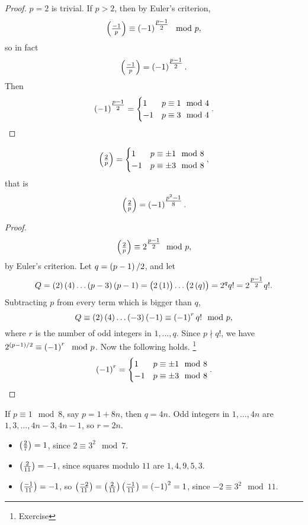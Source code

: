 \begin{proof}
$ p = 2 $ is trivial. If $ p > 2 $, then by Euler's criterion,
$$ \jacobi{-1}{p} \equiv \br{-1}^{\tfrac{p - 1}{2}} \mod p, $$
so in fact
$$ \jacobi{-1}{p} = \br{-1}^{\tfrac{p - 1}{2}}. $$
Then
$$ \br{-1}^{\tfrac{p - 1}{2}} =
\begin{cases}
1 & p \equiv 1 \mod 4 \\
-1 & p \equiv 3 \mod 4
\end{cases}.
$$
\end{proof}

\begin{proposition}
$$ \jacobi{2}{p} =
\begin{cases}
1 & p \equiv \pm 1 \mod 8 \\
-1 & p \equiv \pm 3 \mod 8
\end{cases},
$$
that is
$$ \jacobi{2}{p} = \br{-1}^{\tfrac{p^2 - 1}{8}}. $$
\end{proposition}

\begin{proof}
$$ \jacobi{2}{p} \equiv 2^{\tfrac{p - 1}{2}} \mod p, $$
by Euler's criterion. Let $ q = \br{p - 1} / 2 $, and let
$$ Q = \br{2}\br{4} \dots \br{p - 3}\br{p - 1} = \br{2\br{1}} \dots \br{2\br{q}} = 2^qq! = 2^{\tfrac{p - 1}{2}}q!. $$
Subtracting $ p $ from every term which is bigger than $ q $,
$$ Q \equiv \br{2}\br{4} \dots \br{-3}\br{-1} \equiv \br{-1}^rq! \mod p, $$
where $ r $ is the number of odd integers in $ 1, \dots, q $. Since $ p \nmid q! $, we have $ 2^{\br{p - 1} / 2} \equiv \br{-1}^r \mod p $. Now the following holds. \footnote{Exercise}
$$ \br{-1}^r =
\begin{cases}
1 & p \equiv \pm 1 \mod 8 \\
-1 & p \equiv \pm 3 \mod 8
\end{cases}.
$$
\end{proof}

\pagebreak

\begin{example*}
If $ p \equiv 1 \mod 8 $, say $ p = 1 + 8n $, then $ q = 4n $. Odd integers in $ 1, \dots, 4n $ are $ 1, 3, \dots, 4n - 3, 4n - 1 $, so $ r = 2n $.
\end{example*}

\begin{example*}
\hfill
\begin{itemize}
\item $ \jacobi{2}{7} = 1 $, since $ 2 \equiv 3^2 \mod 7 $.
\item $ \jacobi{2}{11} = -1 $, since squares modulo $ 11 $ are $ 1, 4, 9, 5, 3 $.
\item $ \jacobi{-1}{11} = -1 $, so $ \jacobi{-2}{11} = \jacobi{2}{11}\jacobi{-1}{11} = \br{-1}^2 = 1 $, since $ -2 \equiv 3^2 \mod 11 $.
\end{itemize}
\end{example*}


